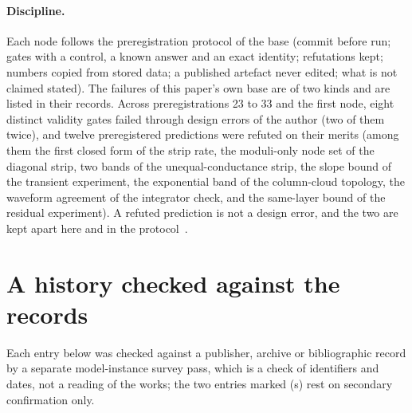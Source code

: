 \documentclass[11pt,a4paper]{article}
\begin{document}
\paragraph{Discipline.} Each node follows the preregistration protocol of the base (commit before run; gates with a control, a known answer and an exact identity; refutations kept; numbers copied from stored data; a published artefact never edited; what is not claimed stated). The failures of this paper's own base are of two kinds and are listed in their records. Across preregistrations 23 to 33 and the first node, eight distinct validity gates failed through design errors of the author (two of them twice), and twelve preregistered predictions were refuted on their merits (among them the first closed form of the strip rate, the moduli-only node set of the diagonal strip, two bands of the unequal-conductance strip, the slope bound of the transient experiment, the exponential band of the column-cloud topology, the waveform agreement of the integrator check, and the same-layer bound of the residual experiment). A refuted prediction is not a design error, and the two are kept apart here and in the protocol~\cite{Protocol}.

\section{A history checked against the records}\label{sec:history}
Each entry below was checked against a publisher, archive or bibliographic record by a separate model-instance survey pass, which is a check of identifiers and dates, not a reading of the works; the two entries marked (s) rest on secondary confirmation only.
\end{document}
